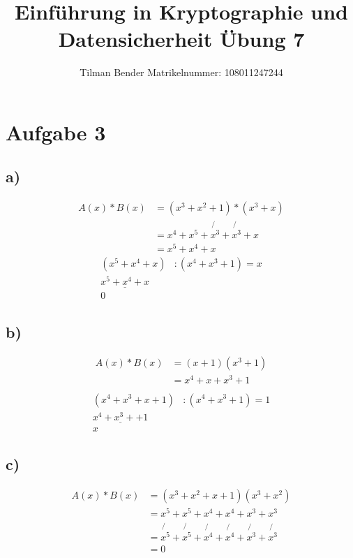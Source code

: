 \documentclass[10pt,a4paper]{article}
\author{Tilman Bender   Matrikelnummer: 108011247244\\}
\title{Einführung in Kryptographie und Datensicherheit Übung 7}
\begin{document}
\maketitle

\section*{Aufgabe 3}
\subsection*{a)}
\begin{align*}
A(x)*B(x) &= (x^{3}+x^{2}+1)*(x^{3}+x)\\
		&=x^{4}+x^{5}+\not{x^{3}}+\not{x^{3}}+x\\
		&=x^{5}+x^{4}+x
\end{align*}
\begin{align*}
(x^{5}+x^{4}+x)&:(x^{4}+x^{3}+1)=x\\
\underline{x^{5}+x^{4}+x}&\\
0
\end{align*}
\subsection*{b)}
\begin{align*}
A(x)*B(x) &= (x+1)(x^{3}+1)\\
		&=x^{4}+x+x^{3}+1\\
\end{align*}
\begin{align*}
(x^{4}+x^{3}+x+1)&:(x^{4}+x^{3}+1)=1\\
\underline{x^{4}+x^{3}+   +1}&\\
x
\end{align*}

\subsection*{c)}
\begin{align*}
A(x)*B(x) &=(x^{3}+x^{2}+x+1)(x^{3}+x^{2})\\
		&=x^{5}+x^{5}+x^{4}+x^{4}+x^{3}+x^{3}\\
		&=\not{x^{5}}+\not{x^{5}}+\not{x^{4}}+\not{x^{4}}+\not{x^{3}}+\not{x^{3}}\\
		&=0
\end{align*}
\end{document}
